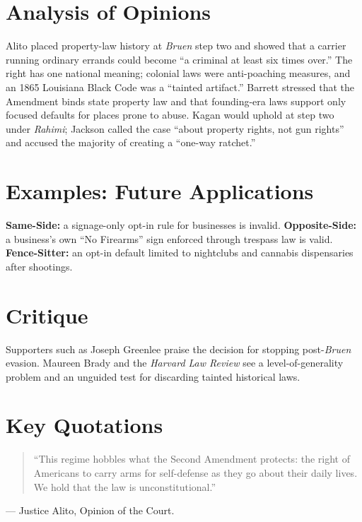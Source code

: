 \documentclass[12pt]{article}
\begin{document}
\section{Analysis of Opinions}
Alito placed property-law history at \textit{Bruen} step two and showed that a carrier running ordinary errands could become ``a criminal at least six times over.'' The right has one national meaning; colonial laws were anti-poaching measures, and an 1865 Louisiana Black Code was a ``tainted artifact.'' Barrett stressed that the Amendment binds state property law and that founding-era laws support only focused defaults for places prone to abuse. Kagan would uphold at step two under \textit{Rahimi}; Jackson called the case ``about property rights, not gun rights'' and accused the majority of creating a ``one-way ratchet.''

\section{Examples: Future Applications}
\textbf{Same-Side:} a signage-only opt-in rule for businesses is invalid. \textbf{Opposite-Side:} a business's own ``No Firearms'' sign enforced through trespass law is valid. \textbf{Fence-Sitter:} an opt-in default limited to nightclubs and cannabis dispensaries after shootings.

\section{Critique}
Supporters such as Joseph Greenlee praise the decision for stopping post-\textit{Bruen} evasion. Maureen Brady and the \textit{Harvard Law Review} see a level-of-generality problem and an unguided test for discarding tainted historical laws.

\section{Key Quotations}
\begin{quote}
``This regime hobbles what the Second Amendment protects: the right of Americans to carry arms for self-defense as they go about their daily lives. We hold that the law is unconstitutional.''
\end{quote}
\noindent --- Justice Alito, Opinion of the Court.
\end{document}
